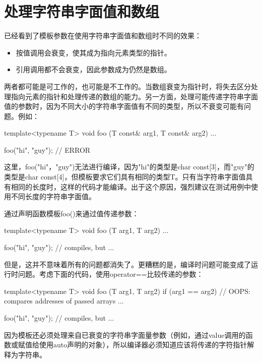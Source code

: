 \section{处理字符串字面值和数组}

已经看到了模板参数在使用字符串字面值和数组时不同的效果：

\begin{itemize}
\item 
按值调用会衰变，使其成为指向元素类型的指针。

\item 
引用调用都不会衰变，因此参数成为仍然是数组。
\end{itemize}

两者都可能是可工作的，也可能是不工作的。当数组衰变为指针时，将失去区分处理指向元素的指针和处理传递的数组的能力。另一方面，处理可能传递字符串字面值的参数时，因为不同大小的字符串字面值有不同的类型，所以不衰变可能有问题。例如：

\begin{cpp}
template<typename T>
void foo (T const& arg1, T const& arg2) {
	...
}

foo("hi", "guy"); // ERROR
\end{cpp}

这里，foo("hi"，"guy")无法进行编译，因为"hi"的类型是char const[3]，而"guy"的类型是char const[4]，但模板要求它们具有相同的类型T。只有当字符串字面值具有相同的长度时，这样的代码才能编译。出于这个原因，强烈建议在测试用例中使用不同长度的字符串字面值。

通过声明函数模板foo()来通过值传递参数：

\begin{cpp}
template<typename T>
void foo (T arg1, T arg2) {
	...
}

foo("hi", "guy"); // compiles, but ...
\end{cpp}

但是，这并不意味着所有的问题都消失了。更糟糕的是，编译时问题可能变成了运行时问题。考虑下面的代码，使用operator==比较传递的参数：

\begin{cpp}
template<typename T>
void foo (T arg1, T arg2) {
	if (arg1 == arg2) { // OOPS: compares addresses of passed arrays
		...
	}
}

foo("hi", "guy"); // compiles, but ...
\end{cpp}

因为模板还必须处理来自已衰变的字符串字面量参数（例如，通过value调用的函数或赋值给使用auto声明的对象），所以编译器必须知道应该将传递的字符指针解释为字符串。

